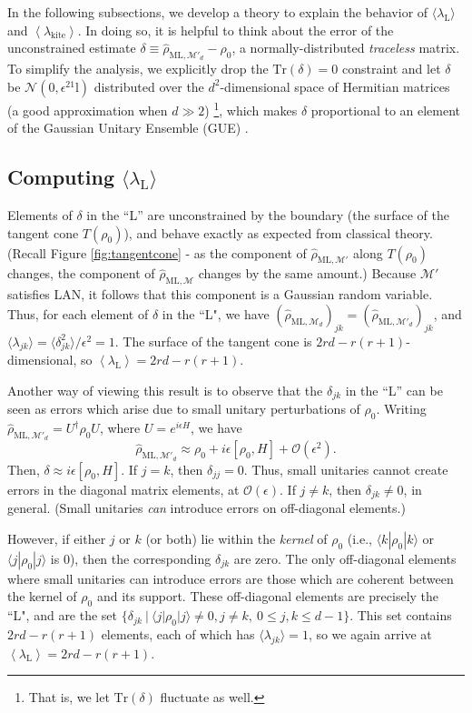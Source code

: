 \documentclass[aps,pra, twocolumn]{revtex4-1}
\newcommand{\M}{\mathcal{M}}
\newcommand{\Tr}{\mathrm{Tr}}
\newcommand{\Id}{\mathbb{I}}
\newcommand{\expect}[1]{\ensuremath{\left\langle#1\right\rangle}}
\def\Id{1\!\mathrm{l}}
\newcommand{\rhohat}{\hat{\rho}}
\newcommand{\rhoML}[1]{\rhohat_{\scriptscriptstyle{\mathrm{ML},#1}}}
\begin{document}
In the following subsections, we develop a theory to explain the behavior of $\langle \lambda_{\mathrm{L}}\rangle$ and \expect{\lambda_{\mathrm{kite}}}.
In doing so, it is helpful to think about the error of the unconstrained estimate $\delta \equiv \rhoML{\M'_{d}}- \rho_{0}$, a normally-distributed \emph{traceless} matrix.  To simplify the analysis, we explicitly drop the $\Tr(\delta)=0$ constraint and let $\delta$ be $\mathcal{N}(0,\epsilon^2\Id)$ distributed over the $d^2$-dimensional space of Hermitian matrices (a good approximation when $d\gg2$) \footnote{That is, we let $\mathrm{Tr}(\delta)$ fluctuate as well.}, which makes $\delta$ proportional to an element of the Gaussian Unitary Ensemble (GUE) \cite{Fyodorov2005}.

\subsection{Computing $\langle \lambda_\mathrm{L}\rangle$}
\label{subsec:L}
Elements of $\delta$ in the ``L'' are unconstrained by the boundary (the surface of the tangent cone $T(\rho_{0})$), and behave exactly as expected from classical theory. (Recall Figure \ref{fig:tangentcone} - as the component of $\rhoML{\M'}$ along $T(\rho_{0})$ changes, the component of $\rhoML{\M}$ changes by the same amount.) Because $\M'$ satisfies LAN, it follows that this component is a Gaussian random variable. Thus, for each element of $\delta$ in the ``L", we have $(\rhoML{\M_{d}})_{jk} = (\rhoML{\M'_{d}})_{jk}$, and $\langle \lambda_{jk} \rangle = \langle \delta_{jk}^{2}\rangle /\epsilon^{2} = 1$. The surface of the tangent cone is $2rd - r(r+1)$-dimensional, so $\expect{\lambda_{\mathrm{L}}} = 2rd - r(r+1)$.

Another way of viewing this result is to observe that the $\delta_{jk}$ in the ``L'' can be seen as errors which arise due to small unitary perturbations of $\rho_{0}$. Writing $\rhoML{\M'_{d}} = U^{\dagger}\rho_{0}U$, where $U=e^{i\epsilon H}$, we have
\[\rhoML{\M'_{d}} \approx \rho_{0} + i\epsilon [\rho_{0},H]+\mathcal{O}(\epsilon^{2}).\]
Then, $\delta \approx i\epsilon [\rho_{0},H]$.
If $j = k$, then $\delta_{jj} = 0$. Thus, small unitaries cannot create errors in the diagonal matrix elements, at $\mathcal{O}(\epsilon)$. If $j \neq k$, then $\delta_{jk} \neq 0$, in general. (Small unitaries \emph{can} introduce errors on off-diagonal elements.)

However, if either $j$ or $k$ (or both) lie within the \emph{kernel} of $\rho_{0}$ (i.e., $\langle k | \rho_{0}| k \rangle$ or $\langle j|\rho_{0}|j\rangle$ is 0), then the corresponding $\delta_{jk}$ are zero. The only off-diagonal elements where small unitaries can introduce errors are those which are coherent between the kernel of $\rho_{0}$ and its support. These off-diagonal elements are precisely the ``L", and are  the set $\{\delta_{jk}~|~\langle j | \rho_{0}|j\rangle \neq 0, j\neq k, ~ 0 \leq j,k \leq d - 1\}$. This set contains $2rd - r(r+1)$ elements, each of which has $\langle \lambda_{jk}\rangle = 1$, so we again arrive at $\expect{\lambda_{\mathrm{L}}} = 2rd - r(r+1)$.
\end{document}
